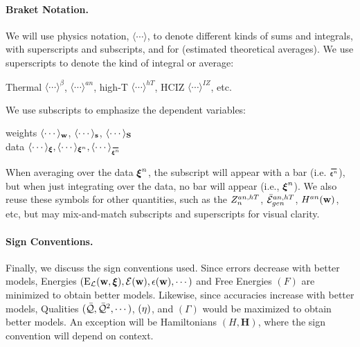 
\paragraph{Braket Notation.}
We will use physics \BraKet notation, $\langle\cdots\rangle$,
to denote different kinds of sums and integrals, with superscripts and subscripts,
and for \ExpectedValues (estimated theoretical averages).
We use superscripts to denote the kind of integral or average:
\begin{center}
Thermal $\langle\cdots\rangle^{\beta}$,
\Annealed $\langle\cdots\rangle^{an}$,
high-T $\langle\cdots\rangle^{hT}$,
HCIZ $\langle\cdots\rangle^{IZ}$, etc.
\end{center}
We use subscripts to emphasize the dependent variables:
\begin{center}
  weights $\langle\cdots\rangle_{{\mathbf{w}}}$, $\langle\cdots\rangle_{{\mathbf{s}}}$, $\langle\cdots\rangle_{{\mathbf{S}}}$ \\ \nonumber
    \vspace{0.33cm}  %
data $\langle\cdots\rangle_{\XI},
\langle\cdots\rangle_{\NDXI},
\langle\cdots\rangle_{\AVGNDXI}$
\end{center}
When averaging over the data $\boldsymbol{\xi}^{n}$,  the subscript will appear with a bar (i.e. $\AVGNDXIn$), but when just integrating over the data, no bar will appear (i.e., $\boldsymbol{\xi}^{n}$). 
We also reuse these symbols for other quantities, such as the $Z^{an,hT}_{n}$, $\bar{\mathcal{E}}_{gen}^{an,hT}$, $H^{an}({\mathbf{w}})$, etc,
but may mix-and-match subscripts and superscripts for visual clarity.

\paragraph{Sign Conventions.}
Finally, we discuss the sign conventions used.  Since errors decrease with better models,
Energies $(\mathrm{E}_{\mathcal{L}}(\mathbf{w},\boldsymbol{\xi}), \mathcal{E}(\mathbf{w}), \epsilon({\mathbf{w}}), \cdots)$ and Free Energies $(F)$ are minimized to obtain better models.
Likewise, since accuracies increase with better models, Qualities $(\bar{\mathcal{Q}}, \bar{\mathcal{Q}}^{2}, \cdots)$,
\SelfOverlap $(\eta)$, and \Quality \GeneratingFunction $(\Gamma)$ would be maximized to obtain better models.
An exception will be Hamiltonians $(H,\mathbf{H})$, where the sign convention will depend on context.

